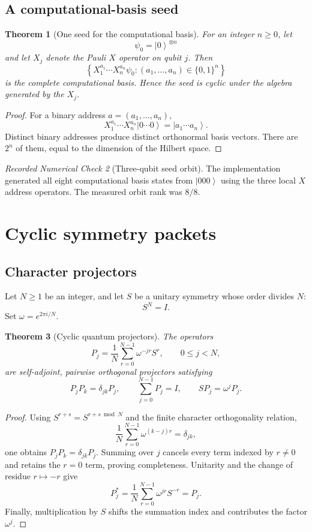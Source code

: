 \documentclass[11pt]{article}
\newtheorem{theorem}{Theorem}[section]
\theoremstyle{definition}
\theoremstyle{remark}
\newtheorem{certificate}[theorem]{Recorded Numerical Check}
\newcommand{\ket}[1]{\left|#1\right\rangle}
\begin{document}
\subsection{A computational-basis seed}

\begin{theorem}[One seed for the computational basis]\label{thm:computational}
For an integer $n\ge0$, let
\[
\psi_0=\ket{0}^{\otimes n}
\]
and let $X_j$ denote the Pauli $X$ operator on qubit $j$. Then
\[
\left\{
X_1^{a_1}\cdots X_n^{a_n}\psi_0:
(a_1,\ldots,a_n)\in\{0,1\}^n
\right\}
\]
is the complete computational basis. Hence the seed is cyclic under the algebra generated by the $X_j$.
\end{theorem}

\begin{proof}
For a binary address $a=(a_1,\ldots,a_n)$,
\[
X_1^{a_1}\cdots X_n^{a_n}\ket{0\cdots0}
=
\ket{a_1\cdots a_n}.
\]
Distinct binary addresses produce distinct orthonormal basis vectors. There are $2^n$ of them, equal to the dimension of the Hilbert space.
\end{proof}

\begin{certificate}[Three-qubit seed orbit]
The implementation generated all eight computational basis states from $\ket{000}$ using the three local $X$ address operators. The measured orbit rank was $8/8$.
\end{certificate}

\section{Cyclic symmetry packets}

\subsection{Character projectors}

Let $N\ge1$ be an integer, and let $S$ be a unitary symmetry whose order divides $N$:
\[
S^N=I.
\]
Set $\omega=e^{2\pi i/N}$.

\begin{theorem}[Cyclic quantum projectors]\label{thm:cyclic}
The operators
\[
\boxed{
P_j
=
\frac1N\sum_{r=0}^{N-1}\omega^{-jr}S^r,
\qquad
0\le j<N,
}
\]
are self-adjoint, pairwise orthogonal projectors satisfying
\[
P_jP_k=\delta_{jk}P_j,
\qquad
\sum_{j=0}^{N-1}P_j=I,
\qquad
SP_j=\omega^jP_j.
\]
\end{theorem}

\begin{proof}
Using $S^{r+s}=S^{r+s\bmod N}$ and the finite character orthogonality relation,
\[
\frac1N\sum_{r=0}^{N-1}\omega^{(k-j)r}=\delta_{jk},
\]
one obtains $P_jP_k=\delta_{jk}P_j$. Summing over $j$ cancels every term indexed by $r\ne0$ and retains the $r=0$ term, proving completeness. Unitarity and the change of residue $r\mapsto-r$ give
\[
P_j^*=\frac1N\sum_{r=0}^{N-1}\omega^{jr}S^{-r}=P_j.
\]
Finally, multiplication by $S$ shifts the summation index and contributes the factor $\omega^j$.
\end{proof}
\end{document}
